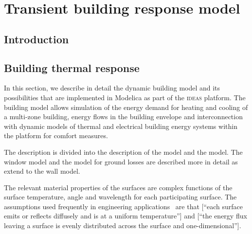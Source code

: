 
\chapter{Transient building response model}



\section{Introduction}

\section{Building thermal response}


In this section, we describe in detail the dynamic building model and its possibilities that are implemented in Modelica as part of the \textsc{ideas} platform. The building model allows simulation of the energy demand for heating and cooling of a multi-zone building, energy flows in the building envelope and interconnection with dynamic models of thermal and electrical building energy systems within the platform for comfort measures. 

The description is divided into the description of the  model and the  model. The window model and the model for ground losses are described more in detail as extend to the wall model.

The relevant material properties of the surfaces are complex functions of the surface temperature, angle and wavelength for each participating surface. The assumptions used frequently in engineering applications~\cite{Walton1983} are that [``each surface emits or reflects diffusely and is at a uniform temperature''] and [``the energy flux leaving a surface is evenly distributed across the surface and one-dimensional'']. 

